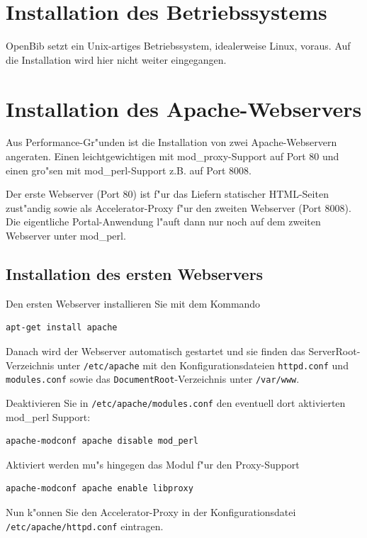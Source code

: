 \documentclass[11pt, twoside, a4paper, BCOR8mm, DIV12, bibtotoc,idxtotoc]{scrbook}
\begin{document}
\section{Installation des Betriebssystems}
OpenBib setzt ein Unix-artiges Betriebssystem, idealerweise Linux,
voraus. Auf die Installation wird hier nicht weiter eingegangen.


\section{Installation des Apache-Webservers}
Aus Performance-Gr"unden ist die Installation von zwei
Apache-Webservern angeraten. Einen leichtgewichtigen mit
mod\_proxy-Support auf Port 80 und einen gro"sen mit mod\_perl-Support
z.B. auf Port 8008. 

Der erste Webserver (Port 80) ist f"ur das Liefern statischer
HTML-Seiten zust"andig sowie als Accelerator-Proxy f"ur den zweiten
Webserver (Port 8008). Die eigentliche Portal-Anwendung l"auft dann
nur noch auf dem zweiten Webserver unter mod\_perl.


\subsection{Installation des ersten Webservers}

Den ersten Webserver installieren Sie mit dem Kommando

\begin{verbatim}
apt-get install apache
\end{verbatim}

Danach wird der Webserver automatisch gestartet und sie finden das
ServerRoot-Verzeichnis unter \texttt{/etc/apache} mit den Konfigurationsdateien
\texttt{httpd.conf} und \texttt{modules.conf} sowie das \texttt{DocumentRoot}-Verzeichnis unter
\texttt{/var/www}.

Deaktivieren Sie in \texttt{/etc/apache/modules.conf} den eventuell
dort aktivierten mod\_perl Support:

\begin{verbatim}
apache-modconf apache disable mod_perl
\end{verbatim}

Aktiviert werden mu"s hingegen das Modul f"ur den Proxy-Support

\begin{verbatim}
apache-modconf apache enable libproxy
\end{verbatim}


Nun k"onnen Sie den Accelerator-Proxy in der Konfigurationsdatei
\texttt{/etc/apache/httpd.conf} eintragen.
\end{document}
